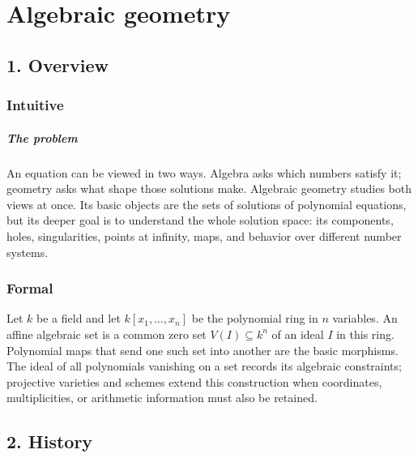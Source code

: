 \clearpage\chapter{Algebraic geometry}
\section*{1. Overview}
\subsection*{Intuitive}
\paragraph{The problem}

An equation can be viewed in two ways. Algebra asks which numbers satisfy it; geometry asks what shape those solutions make. Algebraic geometry studies both views at once. Its basic objects are the sets of solutions of polynomial equations, but its deeper goal is to understand the whole solution space: its components, holes, singularities, points at infinity, maps, and behavior over different number systems.



\subsection*{Formal}
Let $k$ be a field and let $k[x_1,\ldots,x_n]$ be the polynomial ring in $n$ variables. An affine algebraic set is a common zero set $V(I)\subseteq k^n$ of an ideal $I$ in this ring. Polynomial maps that send one such set into another are the basic morphisms. The ideal of all polynomials vanishing on a set records its algebraic constraints; projective varieties and schemes extend this construction when coordinates, multiplicities, or arithmetic information must also be retained.
\section*{2. History}
